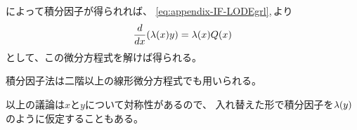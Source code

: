 によって積分因子が得られれば、
\eqref{eq:appendix-IF-LODEgrl},\,より
\begin{gather}
  \frac{d}{dx}({\lambda}(x)y) = {\lambda}(x)Q(x)
\end{gather}
として、この微分方程式を解けば得られる。

積分因子法は二階以上の線形微分方程式でも用いられる。

以上の議論は$x$と$y$について対称性があるので、
入れ替えた形で積分因子を${\lambda}(y)$のように仮定することもある。
